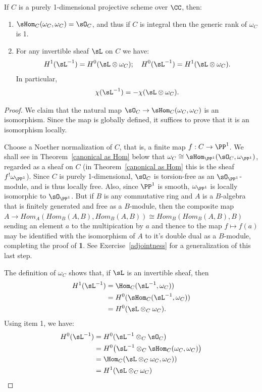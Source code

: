 \begin{proposition}\label{similarities}
If $C$ is a purely 1-dimensional projective scheme over $\CC$, then:
\begin{enumerate}

\item $\sHom_C(\omega_C, \omega_C) = \sO_C$, and  thus if $C$ is integral then the generic rank of $\omega_C$ is 1.

\item For any invertible sheaf $\sL$ on $C$ we have: 
$$
H^1(\sL^{-1})= H^0(\sL\otimes \omega_{C});\quad %
H^0(\sL^{-1} ) = H^1(\sL\otimes \omega_{C}).
$$
In particular,
$$
\chi(\sL^{-1}) = -\chi(\sL\otimes \omega_{C}).
$$

\end{enumerate}
\end{proposition}

\begin{proof}
 We claim that the natural map $\sO_C \to \sHom_C(\omega_C, \omega_C)$ is an isomorphism.
Since the map is globally defined, it suffices to prove that it is an isomorphism locally. 

Choose a Noether
normalization of $C$, that is, a finite map $f: C\to \PP^1$. 
We shall see in Theorem~\ref{canonical as Hom} below that $\omega_C \cong \sHom_{\PP^1}(\sO_C,\omega_{\PP^1})$, regarded as a sheaf on $C$ (in Theorem~\ref{canonical as Hom} this is the sheaf $f^{!}\omega_{\PP^{1}}$).
Since $C$ is purely 1-dimensional, $\sO_{C}$ is torsion-free as an $\sO_{\PP^{1}}$-module, and is thus locally 
free. 
Also, since $\PP^{1}$ is smooth, $\omega_{\PP^{1}}$ is locally
isomorphic to $\sO_{\PP^{1}}$.
But if $B$ is any commutative ring and $A$ is a $B$-algebra that is finitely generated and free as a $B$-module, then the composite map 
$
A \to Hom_{A}(Hom_B(A,B),Hom_B(A,B)) \cong Hom_{B}(Hom_B(A,B), B)
$
sending an element $a$ to the multipication by $a$ and thence to the map $f\mapsto f(a)$ may be identified with the isomorphism of $A$ to 
it's double dual as a $B$-module,
completing the proof of {\bf 1}. See Exercise~\ref{adjointness} for a generalization of this last step.


 The definition of $\omega_C$ shows that, if $\sL$ is an invertible sheaf, then
$$
\begin{aligned}
H^1(\sL^{-1}) &= \Hom_C(\sL^{-1}, \omega_C))\\
&= H^0(\sHom_C(\sL^{-1}, \omega_C))\\
&= H^0(\sL\otimes_C \omega_{C}).
\end{aligned}
$$
Using item 1, we have:
$$
\begin{aligned}
H^0 (\sL^{-1})
&= H^0 (\sL^{-1}\otimes_{C}\sO_{C})\\
&= H^0 \bigl(\sL^{-1}\otimes_{C}\sHom_C(\omega_{C}, \omega_{C})\bigr) \\
&= \Hom_{C}(\sL\otimes_C \omega_{C},  \omega_{C}))\\
&= H^{1}(\sL\otimes_{C}\omega_{C}) 
\end{aligned}
$$
 \end{proof}


